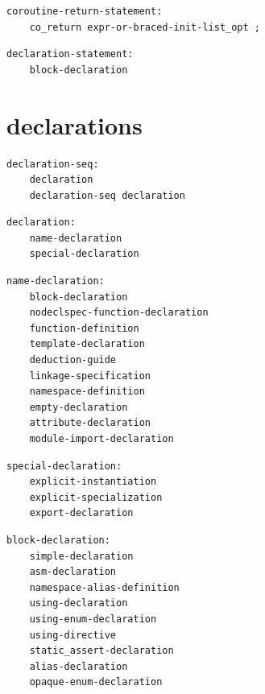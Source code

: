 \noindent\textbf{\texttt{}}\par
\begin{lstlisting}
coroutine-return-statement:
    co_return expr-or-braced-init-list_opt ;
\end{lstlisting}

\noindent\textbf{\texttt{}}\par
\begin{lstlisting}
declaration-statement:
    block-declaration
\end{lstlisting}

\section{declarations}

\noindent\textbf{\texttt{}}\par
\begin{lstlisting}
declaration-seq:
    declaration
    declaration-seq declaration
\end{lstlisting}

\noindent\textbf{\texttt{}}\par
\begin{lstlisting}
declaration:
    name-declaration
    special-declaration
\end{lstlisting}

\noindent\textbf{\texttt{}}\par
\begin{lstlisting}
name-declaration:
    block-declaration
    nodeclspec-function-declaration
    function-definition
    template-declaration
    deduction-guide
    linkage-specification
    namespace-definition
    empty-declaration
    attribute-declaration
    module-import-declaration
\end{lstlisting}

\noindent\textbf{\texttt{}}\par
\begin{lstlisting}
special-declaration:
    explicit-instantiation
    explicit-specialization
    export-declaration
\end{lstlisting}

\noindent\textbf{\texttt{}}\par
\begin{lstlisting}
block-declaration:
    simple-declaration
    asm-declaration
    namespace-alias-definition
    using-declaration
    using-enum-declaration
    using-directive
    static_assert-declaration
    alias-declaration
    opaque-enum-declaration
\end{lstlisting}

